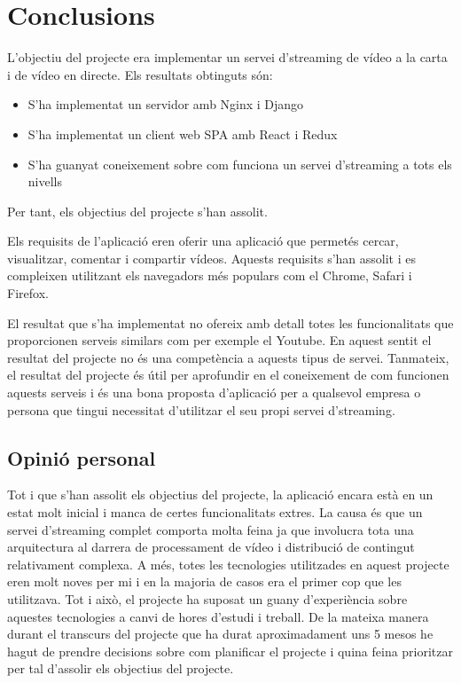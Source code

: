 \documentclass[12pt, titlepage]{article}
\begin{document}
\section{Conclusions}

L'objectiu del projecte era implementar un servei d'streaming de vídeo a la carta
i de vídeo en directe. Els resultats obtinguts són:

\begin{itemize}
\item S'ha implementat un servidor amb Nginx i Django
\item S'ha implementat un client web SPA amb React i Redux
\item S'ha guanyat coneixement sobre com funciona  un servei d'streaming a tots
els nivells
\end{itemize}
Per tant, els objectius del projecte s'han assolit.

Els requisits de l'aplicació eren oferir una aplicació que permetés cercar, visualitzar, comentar
i compartir vídeos. Aquests requisits s'han assolit i es compleixen utilitzant
els navegadors més populars com el Chrome, Safari i Firefox.

El resultat que s'ha implementat no ofereix amb detall totes les funcionalitats
que proporcionen serveis similars com per exemple el Youtube. En aquest sentit el
resultat del projecte no és una competència a aquests tipus de servei. Tanmateix,
el resultat del projecte és útil per aprofundir en el coneixement de com funcionen
aquests serveis i és una bona proposta d'aplicació per a qualsevol empresa o persona
que tingui necessitat d'utilitzar el seu propi servei d'streaming.

\subsection{Opinió personal}
Tot i que s'han assolit els objectius del projecte, la
aplicació encara està en un estat molt inicial i manca de certes funcionalitats extres.
La causa és que un servei d'streaming complet comporta molta feina ja que involucra
tota una arquitectura al darrera de processament de vídeo i distribució de contingut
relativament complexa. A més, totes les tecnologies utilitzades en aquest projecte
eren molt noves per mi i en la majoria de casos era el primer cop que les utilitzava.
Tot i això, el projecte ha suposat un guany d'experiència sobre aquestes tecnologies a canvi
de hores d'estudi i treball. De la mateixa manera durant el transcurs del projecte
que ha durat aproximadament uns 5 mesos he hagut de prendre decisions sobre com planificar
el projecte i quina feina prioritzar per tal d'assolir els objectius del projecte.
\end{document}
